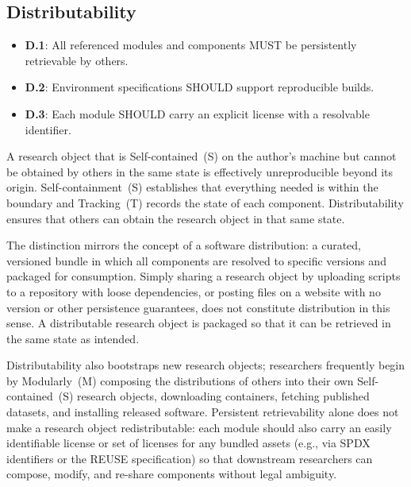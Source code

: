 \documentclass{article}
\makeatletter
\newcommand{\hyanchor}[1]{\texorpdfstring{\Hy@raisedlink{\hypertarget{#1}{}}}{}}
\newcommand{\anchoredsubsection}[2]{\subsection[#2]{\hyanchor{#1}#2}}
\makeatother
\begin{document}
\anchoredsubsection{distributability}{Distributability}

\begin{itemize}
    \item \textbf{D.1}: All referenced modules and components MUST be persistently retrievable by others.
    \item \textbf{D.2}: Environment specifications SHOULD support reproducible builds.
    \item \textbf{D.3}: Each module SHOULD carry an explicit license with a resolvable identifier.
\end{itemize}

A research object that is Self-contained~(S) on the author's machine but cannot be obtained by others in the same state is effectively unreproducible beyond its origin.
Self-containment~(S) establishes that everything needed is within the boundary and Tracking~(T) records the state of each component.
Distributability ensures that others can obtain the research object in that same state.

The distinction mirrors the concept of a software distribution: a curated, versioned bundle in which all components are resolved to specific versions and packaged for consumption.
Simply sharing a research object by uploading scripts to a repository with loose dependencies, or posting files on a website with no version or other persistence guarantees, does not constitute distribution in this sense.
A distributable research object is packaged so that it can be retrieved in the same state as intended.

Distributability also bootstraps new research objects; researchers frequently begin by Modularly~(M) composing the distributions of others into their own Self-contained~(S) research objects, downloading containers, fetching published datasets, and installing released software.
Persistent retrievability alone does not make a research object redistributable: each module should also carry an easily identifiable license or set of licenses for any bundled assets (e.g., via SPDX identifiers\cite{stewart_software_2010} or the REUSE specification\cite{free_software_foundation_europe_reuse_2024}) so that downstream researchers can compose, modify, and re-share components without legal ambiguity.
\end{document}
